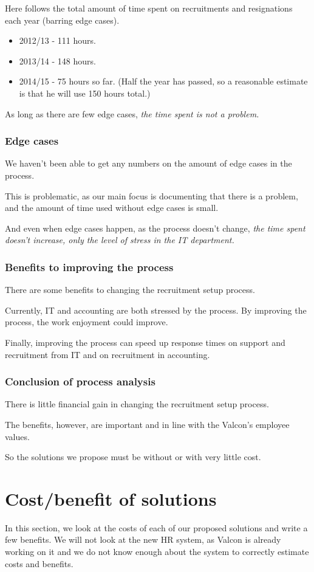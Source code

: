 Here follows the total amount of time spent on recruitments and resignations each year (barring edge cases).
\begin{itemize}
\item 2012/13 - 111 hours.
\item 2013/14 - 148 hours.
\item 2014/15 - 75 hours so far. (Half the year has passed, so a reasonable estimate is that he will use 150 hours total.)
\end{itemize}

As long as there are few edge cases, \emph{the time spent is not a problem.}

\subsubsection{Edge cases}
We haven't been able to get any numbers on the amount of edge cases in the process.

This is problematic, as our main focus is documenting that there is a problem, and the amount of time used without edge cases is small.

And even when edge cases happen, as the process doesn't change, \emph{the time spent doesn't increase, only the level of stress in the IT department.}

\subsubsection{Benefits to improving the process}
There are some benefits to changing the recruitment setup process.

Currently, IT and accounting are both stressed by the process.
By improving the process, the work enjoyment could improve.

Finally, improving the process can speed up response times on support and recruitment from IT and on recruitment in accounting.

\subsubsection{Conclusion of process analysis}
There is little financial gain in changing the recruitment setup process.

The benefits, however, are important and in line with the Valcon's employee values.

So the solutions we propose must be without or with very little cost.

\section{Cost/benefit of solutions}
In this section, we look at the costs of each of our proposed solutions and write a few benefits.
We will not look at the new HR system, as Valcon is already working on it and we do not know enough about the system to correctly estimate costs and benefits.

